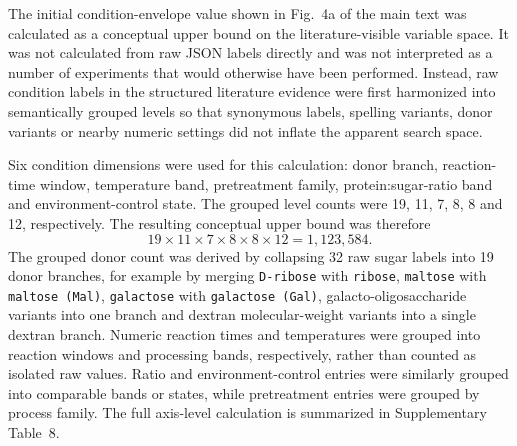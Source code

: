 The initial condition-envelope value shown in Fig.~4a of the main text was calculated as a conceptual upper bound on the literature-visible variable space. It was not calculated from raw JSON labels directly and was not interpreted as a number of experiments that would otherwise have been performed. Instead, raw condition labels in the structured literature evidence were first harmonized into semantically grouped levels so that synonymous labels, spelling variants, donor variants or nearby numeric settings did not inflate the apparent search space.

Six condition dimensions were used for this calculation: donor branch, reaction-time window, temperature band, pretreatment family, protein:sugar-ratio band and environment-control state. The grouped level counts were 19, 11, 7, 8, 8 and 12, respectively. The resulting conceptual upper bound was therefore
\[
19 \times 11 \times 7 \times 8 \times 8 \times 12 = 1{,}123{,}584.
\]
The grouped donor count was derived by collapsing 32 raw sugar labels into 19 donor branches, for example by merging \texttt{D-ribose} with \texttt{ribose}, \texttt{maltose} with \texttt{maltose (Mal)}, \texttt{galactose} with \texttt{galactose (Gal)}, galacto-oligosaccharide variants into one branch and dextran molecular-weight variants into a single dextran branch. Numeric reaction times and temperatures were grouped into reaction windows and processing bands, respectively, rather than counted as isolated raw values. Ratio and environment-control entries were similarly grouped into comparable bands or states, while pretreatment entries were grouped by process family. The full axis-level calculation is summarized in Supplementary Table~8.


